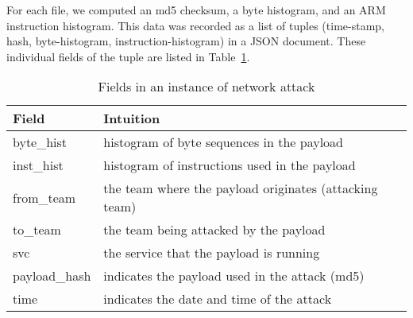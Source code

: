\documentclass[conference]{IEEEtran}
\begin{document}
For each file, we computed an md5 checksum, a byte histogram, and an ARM instruction histogram. This data was recorded as a list of tuples (time-stamp, hash, byte-histogram, instruction-histogram) in a JSON document. These individual fields of the tuple are listed in Table~\ref{exAt}. 
\vspace{-1em}
\begin{table}[h!]
	\caption{\textmd{Fields in an instance of network attack}}
	\label{exAt}
	\tiny
	\centering
	\renewcommand{\arraystretch}{1.5}
	
	\begin{tabular}{|p{2.3cm}|p{4cm}|} 
		\hline
		{\bf Field} &  {\bf Intuition} \\ \hline 
		
		\textsf{byte\_hist} & histogram of byte sequences in the payload\\ \hline
		\textsf{inst\_hist} & histogram of instructions used in the payload\\ \hline
		\textsf{from\_team} & the team where the payload originates (attacking team)\\ \hline
		\textsf{to\_team} & the team being attacked by the payload\\ \hline
		\textsf{svc} & the service that the payload is running\\ \hline
		\textsf{payload\_hash} & indicates the payload used in the attack (md5)\\ \hline
		\textsf{time} & indicates the date and time of the attack\\
		\hline
	\end{tabular}
	\vspace{-1em}
	
\end{table}
\vspace{-0.5em}
\end{document}
